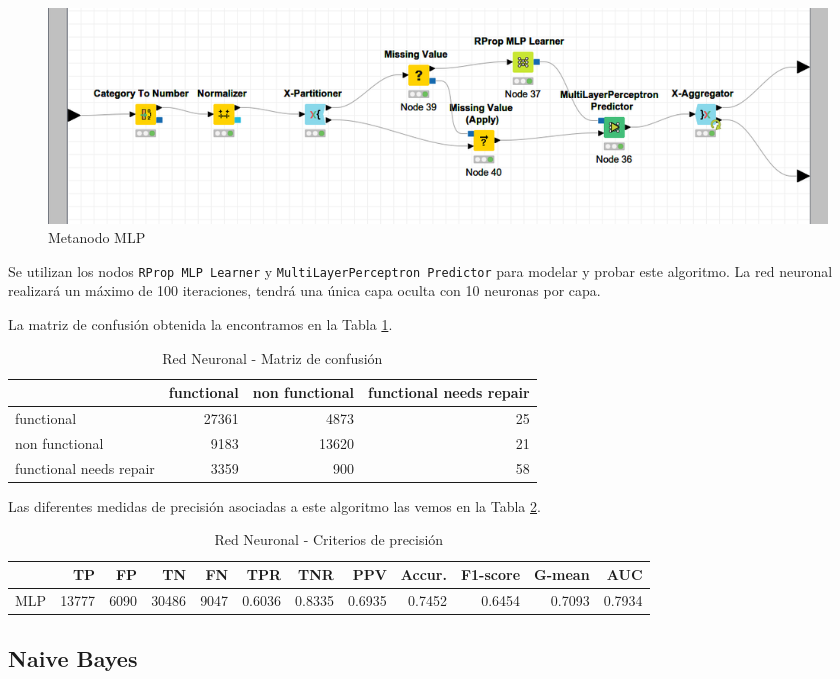 \documentclass[a4paper, 20pt]{article}
\begin{document}
\begin{figure}[H]
    \centering
    \includegraphics[width=1\textwidth]{MLP}
    \caption{Metanodo MLP}
    \label{fig:MLP}
\end{figure}

Se utilizan los nodos \texttt{RProp MLP Learner} y \texttt{MultiLayerPerceptron Predictor} para modelar y probar este algoritmo. La red neuronal realizará un máximo de 100 iteraciones, tendrá una única capa oculta con 10 neuronas por capa.

La matriz de confusión obtenida la encontramos en la Tabla \ref{tab:CMMLP}.

\begin{table}[H]
\centering
\caption{Red Neuronal - Matriz de confusión}
\label{tab:CMMLP}
\begin{tabular}{lrrr}
\toprule
 & functional & non functional & functional needs repair\\ \midrule
functional & 27361 & 4873 & 25\\
non functional & 9183 & 13620 & 21\\
functional needs repair & 3359 & 900 & 58\\
\bottomrule
\end{tabular}
\end{table}


Las diferentes medidas de precisión asociadas a este algoritmo las vemos en la Tabla \ref{tab:MLP}.

\begin{table}[H]
\centering
\caption{Red Neuronal - Criterios de precisión}
\label{tab:MLP}
\begin{tabular}{lrrrrrrrrrrr}
\toprule
 & TP & FP & TN & FN & TPR & TNR & PPV & Accur. & F1-score & G-mean & AUC\\ \midrule
MLP & 13777 & 6090 & 30486 & 9047 & 0.6036 & 0.8335 & 0.6935 & 0.7452 & 0.6454 & 0.7093 & 0.7934\\
\bottomrule
\end{tabular}
\end{table}


\subsection{Naive Bayes}
\end{document}
